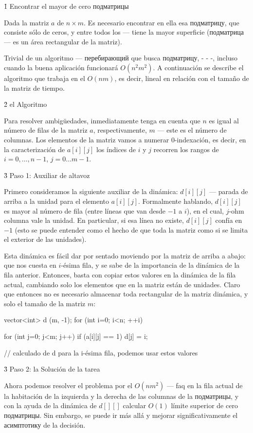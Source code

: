 \h1{ Encontrar el mayor de cero подматрицы }

Dada la matriz $a$ de $n \times m$. Es necesario encontrar en ella esa подматрицу, que consiste sólo de ceros, y entre todos los --- tiene la mayor superficie (подматрица --- es un área rectangular de la matriz).

Trivial de un algoritmo --- перебирающий que busca подматрицу, - - -, incluso cuando la buena aplicación funcionará $O (n^2 m^2)$. A continuación se describe el algoritmo que trabaja en el $O (n m)$, es decir, lineal en relación con el tamaño de la matriz de tiempo.


\h2{ el Algoritmo }

Para resolver ambigüedades, inmediatamente tenga en cuenta que $n$ es igual al número de filas de la matriz $a$, respectivamente, $m$ --- este es el número de columnas. Los elementos de la matriz vamos a numerar $0$-indexación, es decir, en la caracterización de $a[i][j]$ los índices de $i$ y $j$ recorren los rangos de $i = 0, \ldots, n-1$, $j = 0 \ldots m-1$.


\h3{ Paso 1: Auxiliar de altavoz }

Primero consideramos la siguiente auxiliar de la dinámica: $d[i][j]$ --- parada de arriba a la unidad para el elemento $a[i][j]$. Formalmente hablando, $d[i][j]$ es mayor al número de fila (entre líneas que van desde $-1$ a $i$), en el cual, $j$-ohm columna vale la unidad. En particular, si esa línea no existe, $d[i][j]$ confía en $-1$ (esto se puede entender como el hecho de que toda la matriz como si se limita el exterior de las unidades).

Esta dinámica es fácil dar por sentado moviendo por la matriz de arriba a abajo: que nos cuesta en $i$-ésima fila, y se sabe de la importancia de la dinámica de la fila anterior. Entonces, basta con copiar estos valores en la dinámica de la fila actual, cambiando solo los elementos que en la matriz están de unidades. Claro que entonces no es necesario almacenar toda rectangular de la matriz dinámica, y solo el tamaño de la matriz $m$:

\code
vector<int> d (m, -1);
for (int i=0; i<n; ++i) {
for (int j=0; j<m; j++)
if (a[i][j] == 1)
d[j] = i;

// calculado de d para la i-ésima fila, podemos usar estos valores
}
\endcode


\h3{ Paso 2: la Solución de la tarea }

Ahora podemos resolver el problema por el $O (n m^2)$ --- faq en la fila actual de la habitación de la izquierda y la derecha de las columnas de la подматрицы, y con la ayuda de la dinámica de $d[][]$ calcular $O (1)$ límite superior de cero подматрицы. Sin embargo, se puede ir más allá y mejorar significativamente el асимптотику de la decisión.

